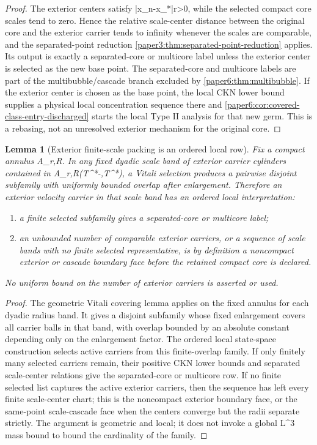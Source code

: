\documentclass[11pt]{amsart}
\def\({}%
\def\){}%
\theoremstyle{plain}
\newtheorem{lemma}[lemma]{Lemma}
\theoremstyle{definition}
\theoremstyle{remark}
\begin{document}
\begin{proof}
The exterior centers satisfy \(|x_n-x_*|\ge r>0\), while the selected compact
core scales tend to zero.  Hence the relative scale-center distance between
the original core and the exterior carrier tends to infinity whenever the
scales are comparable, and the separated-point reduction
\cref{paper3:thm:separated-point-reduction} applies.  Its output is exactly a
separated-core or multicore label unless the exterior center is selected as the
new base point.  The separated-core and multicore labels are part of the
multibubble/cascade branch excluded by \cref{paper6:thm:multibubble}.  If the
exterior center is chosen as the base point, the local CKN lower bound supplies
a physical local concentration sequence there and
\cref{paper6:cor:covered-class-entry-discharged} starts the local Type II
analysis for that new germ.  This is a rebasing, not an unresolved exterior
mechanism for the original core.
\end{proof}

\begin{lemma}[Exterior finite-scale packing is an ordered local row]
\label{paper8:lem:exterior-finite-scale-packing}
Fix a compact annulus \(A_{r,R}\).  In any fixed dyadic scale band of exterior
carrier cylinders contained in \(A_{r,R}\times(T^*-\delta,T^*)\), a Vitali
selection produces a pairwise disjoint subfamily with uniformly bounded overlap
after enlargement.  Therefore an exterior velocity carrier in that scale band
has an ordered local interpretation:
\begin{enumerate}[label=\textup{(\roman*)}]
\item a finite selected subfamily gives a separated-core or multicore label;
\item an unbounded number of comparable exterior carriers, or a sequence of
scale bands with no finite selected representative, is by definition a
noncompact exterior or cascade boundary face before the retained compact core is
declared.
\end{enumerate}
No uniform bound on the number of exterior carriers is asserted or used.
\end{lemma}

\begin{proof}
The geometric Vitali covering lemma applies on the fixed annulus for each
dyadic radius band.  It gives a disjoint subfamily whose fixed enlargement
covers all carrier balls in that band, with overlap bounded by an absolute
constant depending only on the enlargement factor.  The ordered local
state-space construction selects active carriers from this finite-overlap
family.  If only finitely many selected carriers remain, their positive CKN
lower bounds and separated scale-center relations give the separated-core or
multicore row.  If no finite selected list captures the active exterior
carriers, then the sequence has left every finite scale-center chart; this is
the noncompact exterior boundary face, or the same-point scale-cascade face
when the centers converge but the radii separate strictly.  The argument is
geometric and local; it does not invoke a global \(L^3\) mass bound to bound
the cardinality of the family.
\end{proof}
\end{document}
